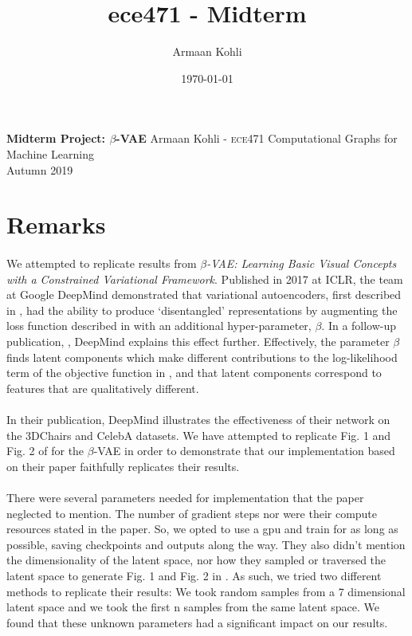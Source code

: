 \documentclass[justified,nobib]{tufte-handout}
\title{ece471 - Midterm}
\author{Armaan Kohli}
\date{\today}
\begin{document}
\begin{fullwidth}
{
  \noindent\fontsize{12pt}{20pt}\selectfont\textbf{Midterm Project: $\beta$-VAE}
  \newline
  \fontsize{12pt}{18pt}\selectfont
  {Armaan Kohli - \scshape ece}471 Computational Graphs for Machine Learning \\Autumn 2019\\
}
\raggedright
\raggedbottom
\section{Remarks}
\paragraph{} We attempted to replicate results from \textit{$\beta$-VAE: Learning Basic Visual Concepts with a Constrained Variational Framework}\cite{bvae}. Published in 2017 at ICLR, the team at Google DeepMind demonstrated that variational autoencoders, first described in \cite{vae}, had the ability to produce `disentangled' representations by augmenting the loss function described in \citep{vae} with an additional hyper-parameter, $\beta$. In a follow-up publication, \cite{bvae-dis}, DeepMind explains this effect further. Effectively, the parameter $\beta$ finds latent components which make different contributions to the log-likelihood term of the objective function in \citep{vae}, and that latent components correspond to features that are qualitatively different.

\paragraph{} In their publication, DeepMind illustrates the effectiveness of their network on the 3DChairs and CelebA datasets. We have attempted to replicate Fig. 1 and Fig. 2 of \citep{bvae} for the $\beta$-VAE in order to demonstrate that our implementation based on their paper faithfully replicates their results. 

\paragraph{} There were several parameters needed for implementation that the paper neglected to mention. The number of gradient steps nor were their compute resources stated in the paper. So, we opted to use a gpu and train for as long as possible, saving checkpoints and outputs along the way. They also didn't mention the dimensionality of the latent space, nor how they sampled or traversed the latent space to generate Fig. 1 and Fig. 2 in \citep{bvae}. As such, we tried two different methods to replicate their results: We took random samples from a 7 dimensional latent space and we took the first n samples from the same latent space. We found that these unknown parameters had a significant impact on our results. 



\end{fullwidth}
\end{document}

